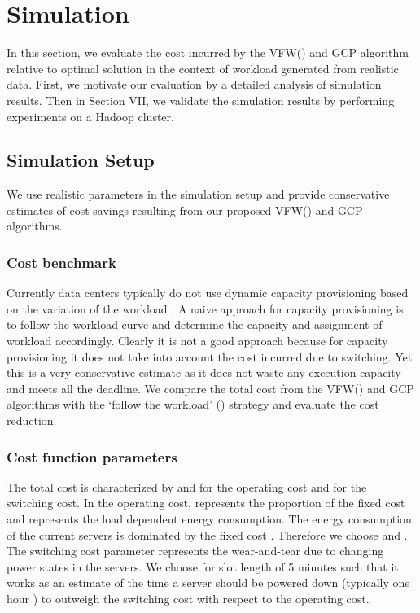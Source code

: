 \documentclass[10pt,conference,compsocconf,letterpaper]{IEEEtran}
\begin{document}
\section{Simulation}
In this section, we evaluate the cost incurred by the VFW() and GCP algorithm relative to optimal solution in the context of workload generated from realistic data. First, we motivate our evaluation by a detailed analysis of simulation results. Then in Section VII, we validate the simulation results by performing experiments on a Hadoop cluster.



\subsection{Simulation Setup}
We use realistic parameters in the simulation setup and provide conservative estimates of cost savings resulting from our proposed VFW() and GCP algorithms.



\subsubsection*{Cost benchmark}
Currently data centers typically do not use dynamic capacity provisioning based on the variation of the workload \cite{9}. A naive approach for capacity provisioning is to follow the workload curve and determine the capacity and assignment of workload accordingly. Clearly it is not a good approach because for capacity provisioning it does not take into account the cost incurred due to switching. Yet this is a very conservative estimate as it does not waste any execution capacity and meets all the deadline. We compare the total cost from the VFW() and GCP algorithms with the `follow the workload' () strategy and evaluate the cost reduction.



\subsubsection*{Cost function parameters}
The total cost is characterized by  and  for the operating cost and  for the switching cost. In the operating cost,  represents the proportion of the fixed cost and  represents the load dependent energy consumption.  The energy consumption of the current servers is dominated by the fixed cost \cite{19}. Therefore we choose  and . The switching cost parameter  represents the wear-and-tear due to changing power states in the servers. We choose  for slot length of 5 minutes such that it works as an estimate of the time a server should be powered down (typically one hour \cite{9,21}) to outweigh the switching cost with respect to the operating cost.
\end{document}
